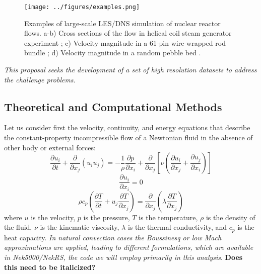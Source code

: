 \begin{figure}[!ht]
\centering
\texttt{[image: ../figures/examples.png]}
\caption{Examples of large-scale LES/DNS simulation of nuclear reactor flows. a-b) Cross sections of the flow in helical coil steam generator experiment \cite{alper2018}; c) Velocity magnitude in a 61-pin wire-wrapped rod bundle \cite{goth2018comparison}; d) Velocity magnitude in a random pebble bed \cite{yuan2019}.}
\label{f:examples}
\end{figure}


\textit{This proposal seeks the development of a set of high resolution datasets to address the challenge problems}.

\vspace{-.25in}
\subsection{Theoretical and Computational Methods}
\vspace{-.2in}

Let us consider first  the velocity, continuity, and energy equations that describe the constant-property incompressible flow of a Newtonian fluid in the absence of other body or external forces:
\begin{equation}
\frac{\partial  u_i  }{\partial t} +  \frac{\partial}{\partial x_j} \left( u_i u_j \right) =-\frac{1}{\rho} \frac{\partial p}{\partial x_i} + \frac{\partial}{\partial x_j} \left[ \nu \left( \frac{\partial u_i}{\partial x_j} +\frac{\partial u_j}{\partial x_i} \right) \right]
\label{UEqn}
\end{equation}
\begin{equation}
\frac{\partial u_i}{\partial x_i} = 0
\label{rhoEqn}
\end{equation}
\begin{equation}
\rho c_p \left( \frac{\partial T }{\partial t} + u_j \frac{\partial T}{\partial x_j} \right) = \frac{\partial }{\partial x_j} \left( \lambda \frac{\partial T}{\partial x_j} \right)
\label{EEqn}
\end{equation}
where $u$ is the velocity, $p$ is the pressure, $T$ is the temperature, $\rho$ is the  density of the fluid, $\nu$ is the kinematic viscosity, $\lambda$ is the thermal conductivity, and $c_p$ is the heat capacity. \textit{In natural convection cases the Boussinesq or low Mach approximations} \cite{tomboulides1997numerical} \textit{are applied, leading to different formulations, which are available in Nek5000/NekRS, the code we will employ primarily in this analysis}. {\bf Does this need to be italicized?}

